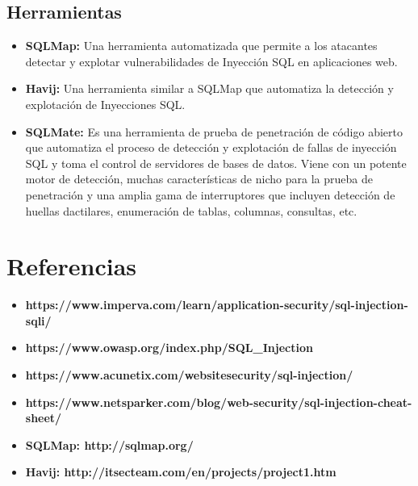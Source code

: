 \documentclass{article}
\begin{document}
\subsection{Herramientas}
\begin{itemize}
    \item \textbf{SQLMap:} Una herramienta automatizada que permite a los atacantes detectar y explotar vulnerabilidades de Inyección SQL en aplicaciones web.
    \item \textbf{Havij:} Una herramienta similar a SQLMap que automatiza la detección y explotación de Inyecciones SQL.
    \item \textbf{SQLMate:} Es una herramienta de prueba de penetración de código abierto que automatiza el proceso de detección y explotación de fallas de inyección SQL y toma el control de servidores de bases de datos. Viene con un potente motor de detección, muchas características de nicho para la prueba de penetración y una amplia gama de interruptores que incluyen detección de huellas dactilares, enumeración de tablas, columnas, consultas, etc.
\end{itemize}

\section{Referencias}
\begin{itemize}
    \item \textbf{https://www.imperva.com/learn/application-security/sql-injection-sqli/}
    \item \textbf{https://www.owasp.org/index.php/SQL\_Injection}
    \item \textbf{https://www.acunetix.com/websitesecurity/sql-injection/}
    \item \textbf{https://www.netsparker.com/blog/web-security/sql-injection-cheat-sheet/}
    \item \textbf{SQLMap: http://sqlmap.org/}
    \item \textbf{Havij: http://itsecteam.com/en/projects/project1.htm}
\end{itemize}
\end{document}
